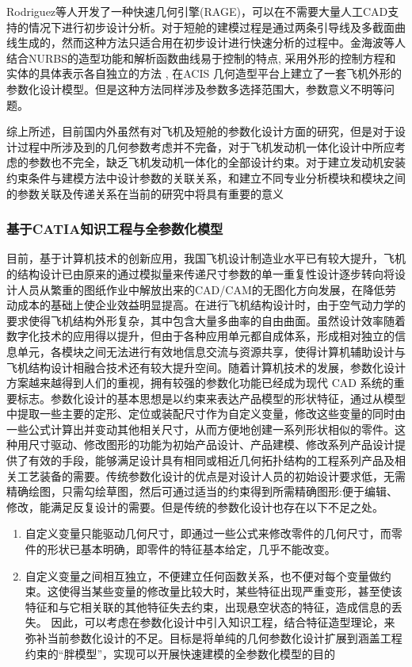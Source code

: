 \documentclass[12pt,a4paper]{report}
\begin{document}
Rodriguez等人开发了一种快速几何引擎(RAGE)，可以在不需要大量人工CAD支持的情况下进行初步设计分析。对于短舱的建模过程是通过两条引导线及多截面曲线生成的，然而这种方法只适合用在初步设计进行快速分析的过程中。金海波等人结合NURBS的造型功能和解析函数曲线易于控制的特点, 采用外形的控制方程和实体的具体表示各自独立的方法 , 在ACIS 几何造型平台上建立了一套飞机外形的参数化设计模型。但是这种方法同样涉及参数多选择范围大，参数意义不明等问题。

综上所述，目前国内外虽然有对飞机及短舱的参数化设计方面的研究，但是对于设计过程中所涉及到的几何参数考虑并不完备，对于飞机发动机一体化设计中所应考虑的参数也不完全，缺乏飞机发动机一体化的全部设计约束。对于建立发动机安装约束条件与建模方法中设计参数的关联关系，和建立不同专业分析模块和模块之间的参数关联及传递关系在当前的研究中将具有重要的意义

\subsubsection{基于CATIA知识工程与全参数化模型}
目前，基于计算机技术的创新应用，我国飞机设计制造业水平已有较大提升，飞机的结构设计已由原来的通过模拟量来传递尺寸参数的单一重复性设计逐步转向将设计人员从繁重的图纸作业中解放出来的CAD/CAM的无图化方向发展，在降低劳动成本的基础上使企业效益明显提高。在进行飞机结构设计时，由于空气动力学的要求使得飞机结构外形复杂，其中包含大量多曲率的自由曲面。虽然设计效率随着数字化技术的应用得以提升，但由于各种应用单元都自成体系，形成相对独立的信息单元，各模块之间无法进行有效地信息交流与资源共享，使得计算机辅助设计与飞机结构设计相融合技术还有较大提升空间。随着计算机技术的发展，参数化设计方案越来越得到人们的重视，拥有较强的参数化功能已经成为现代 CAD 系统的重要标志。参数化设计的基本思想是以约束来表达产品模型的形状特征，通过从模型中提取一些主要的定形、定位或装配尺寸作为自定义变量，修改这些变量的同时由一些公式计算出并变动其他相关尺寸，从而方便地创建一系列形状相似的零件。这种用尺寸驱动、修改图形的功能为初始产品设计、产品建模、修改系列产品设计提供了有效的手段，能够满足设计具有相同或相近几何拓扑结构的工程系列产品及相关工艺装备的需要。传统参数化设计的优点是对设计人员的初始设计要求低，无需精确绘图，只需勾绘草图，然后可通过适当的约束得到所需精确图形:便于编辑、修改，能满足反复设计的需要。但是传统的参数化设计也存在以下不足之处。

\begin{enumerate}
\item 自定义变量只能驱动几何尺寸，即通过一些公式来修改零件的几何尺寸，而零件的形状已基本明确，即零件的特征基本给定，几乎不能改变。

\item 自定义变量之间相互独立，不便建立任何函数关系，也不便对每个变量做约束。这使得当某些变量的修改量比较大时，某些特征出现严重变形，甚至使该特征和与它相关联的其他特征失去约束，出现悬空状态的特征，造成信息的丢失。
因此，可以考虑在参数化设计中引入知识工程，结合特征造型理论，来弥补当前参数化设计的不足。目标是将单纯的几何参数化设计扩展到涵盖工程约束的“胖模型”，实现可以开展快速建模的全参数化模型的目的
\end{enumerate}
\end{document}
